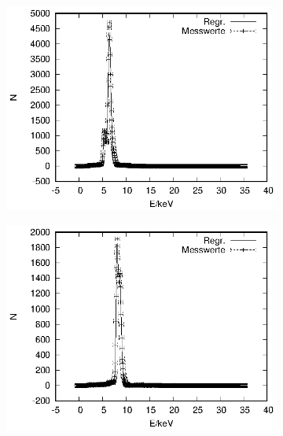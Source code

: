 \begin{figure}[!h]
  \ContinuedFloat
  \centering
  \begin{subfigure}[h]{0.5\textwidth}
    \centering
    \includegraphics{data/Massenanteil/probe_1.eps}
  \end{subfigure}%
  \begin{subfigure}[h]{0.5\textwidth}
    \centering
    \includegraphics{data/Massenanteil/probe_2.eps}
  \end{subfigure}
  \begin{subfigure}[h]{0.5\textwidth}
    \centering

\end{subfigure}
\end{figure}

